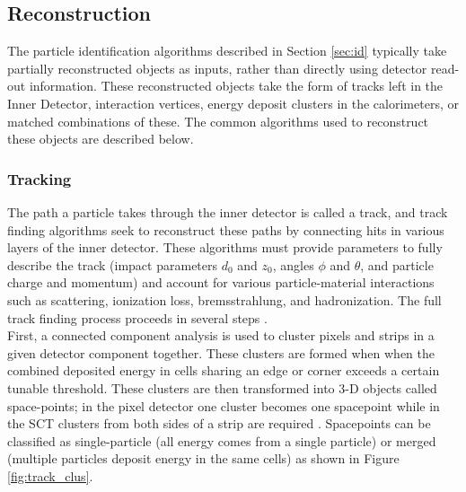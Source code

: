 \subsection{Reconstruction}
The particle identification algorithms described in Section \ref{sec:id} typically take partially reconstructed objects as inputs, rather than directly using detector read-out information. These reconstructed objects take the form of tracks left in the Inner Detector, interaction vertices, energy deposit clusters in the calorimeters, or matched combinations of these. The common algorithms used to reconstruct these objects are described below. 

\subsubsection{Tracking}\label{sec:tracking}
The path a particle takes through the inner detector is called a track, and track finding algorithms seek to reconstruct these paths by connecting hits in various layers of the inner detector. These algorithms must provide parameters to fully describe the track (impact parameters $d_0$ and $z_0$, angles $\phi$ and $\theta$, and particle charge and momentum) and account for various particle-material interactions such as scattering, ionization loss, bremsstrahlung, and hadronization. The full track finding process proceeds in several steps \cite{track_run1}.\\

First, a connected component analysis is used to cluster pixels and strips in a given detector component together. These clusters are formed when when the combined deposited energy in cells sharing an edge or corner exceeds a certain tunable threshold. These clusters are then transformed into 3-D objects called space-points; in the pixel detector one cluster becomes one spacepoint while in the SCT clusters from both sides of a strip are required \cite{track_run2}. Spacepoints can be classified as single-particle (all energy comes from a single particle) or merged (multiple particles deposit energy in the same cells) as shown in Figure \ref{fig:track_clus}.\\

